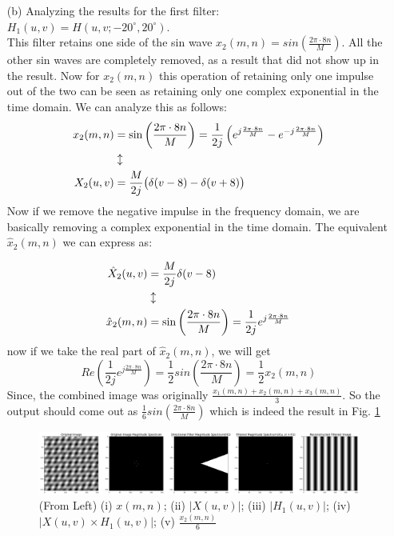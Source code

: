 \documentclass[12pt,a4paper,onecolumn]{exam}
\begin{document}
\begin{solution}
\begin{itemize}
    \item[(b)] Analyzing the results for the first filter:\\
    $H_1(u,v)= H(u,v; -20 ^{\circ},20^{\circ})$. \\
    This filter retains one side of the sin wave $x_2(m,n) = sin(\frac{2\pi \cdot 8n}{M})$. All the other sin waves are completely removed, as a result that did not show up in the result. Now for $x_2(m,n)$ this operation of retaining only one impulse out of the two can be seen as retaining only one complex exponential in the time domain. We can analyze this as follows:
\[
\begin{aligned}
x_2(m,n) &= \sin\left(\frac{2\pi \cdot 8n}{M}\right)
          = \frac{1}{2j}\left(e^{j\frac{2\pi \cdot 8n}{M}} - e^{-j\frac{2\pi \cdot 8n}{M}}\right) \notag \\
          & \updownarrow \notag\\
X_2(u,v) &= \frac{M}{2j}\big(\delta(v-8) - \delta(v+8)\big) \notag
\end{aligned}
\]
Now if we remove the negative impulse in the frequency domain, we are basically removing a complex exponential in the time domain. The equivalent $\hat x_2(m,n)$ we can express as:

\[
\begin{aligned}
\hat X_2(u,v) &= \frac{M}{2j}\delta(v-8) \notag \\
 & \updownarrow \notag\\
\hat x_2(m,n) &= \sin\left(\frac{2\pi \cdot 8n}{M}\right)
          = \frac{1}{2j}e^{j\frac{2\pi \cdot 8n}{M}} \notag
\end{aligned}
\]
now if we take the real part of $\hat x_2(m,n)$, we will get $$Re\left(\frac{1}{2j}e^{j\frac{2\pi \cdot 8n}{M}}\right) =  \frac{1}{2}sin\left(\frac{2\pi \cdot 8n}{M}\right) = \frac{1}{2}x_2(m,n)$$ 
Since, the combined image was originally $\frac{x_1(m,n)+x_2(m,n)+x_3(m,n)}{3}$. So the output should come out as $\frac{1}{6}sin\left(\frac{2\pi \cdot 8n}{M}\right)$ which is indeed the result in Fig. \ref{fig:1bi}

        \begin{figure}[H]
        \centering
        \includegraphics[scale = .18]{Output_Images/P01bi.png}
        \caption{(From Left) (i) $x(m,n)$; (ii) $|X(u,v)|$; (iii) $|H_1(u,v)|$; (iv) $|X(u,v) \times H_1(u,v)|$; (v) $\frac{x_2(m,n)}{6}$}
        \label{fig:1bi}
        \end{figure}


\end{itemize}
\end{solution}
\end{document}
